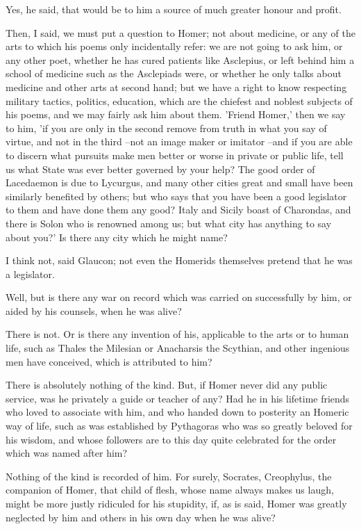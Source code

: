 Yes, he said, that would be to him a source of much greater honour and profit.

Then, I said, we must put a question to Homer; not about medicine, or any of the arts to which his poems only incidentally refer: we are not going to ask him, or any other poet, whether he has cured patients like Asclepius, or left behind him a school of medicine such as the Asclepiads were, or whether he only talks about medicine and other arts at second hand; but we have a right to know respecting military tactics, politics, education, which are the chiefest and noblest subjects of his poems, and we may fairly ask him about them. 'Friend Homer,' then we say to him, 'if you are only in the second remove from truth in what you say of virtue, and not in the third --not an image maker or imitator --and if you are able to discern what pursuits make men better or worse in private or public life, tell us what State was ever better governed by your help? The good order of Lacedaemon is due to Lycurgus, and many other cities great and small have been similarly benefited by others; but who says that you have been a good legislator to them and have done them any good? Italy and Sicily boast of Charondas, and there is Solon who is renowned among us; but what city has anything to say about you?' Is there any city which he might name?

I think not, said Glaucon; not even the Homerids themselves pretend that he was a legislator.

Well, but is there any war on record which was carried on successfully by him, or aided by his counsels, when he was alive?

There is not.
Or is there any invention of his, applicable to the arts or to human life, such as Thales the Milesian or Anacharsis the Scythian, and other ingenious men have conceived, which is attributed to him?

There is absolutely nothing of the kind.
But, if Homer never did any public service, was he privately a guide or teacher of any? Had he in his lifetime friends who loved to associate with him, and who handed down to posterity an Homeric way of life, such as was established by Pythagoras who was so greatly beloved for his wisdom, and whose followers are to this day quite celebrated for the order which was named after him?

Nothing of the kind is recorded of him. For surely, Socrates, Creophylus, the companion of Homer, that child of flesh, whose name always makes us laugh, might be more justly ridiculed for his stupidity, if, as is said, Homer was greatly neglected by him and others in his own day when he was alive?

